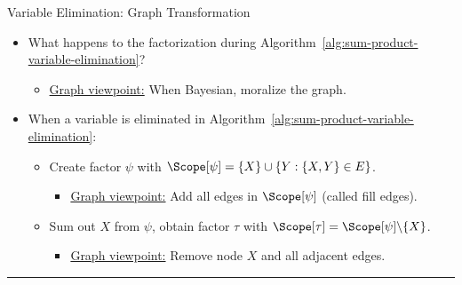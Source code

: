 \begin{frame}{Variable Elimination: Graph Transformation}
\begin{itemize}
    \item What happens to the factorization during Algorithm~\ref{alg:sum-product-variable-elimination}?
    \pause
    \begin{itemize}
        \item \underline{Graph viewpoint:} When Bayesian, moralize the graph.
    \end{itemize}
    \pause
    \item When a variable is eliminated in Algorithm~\ref{alg:sum-product-variable-elimination}:
    \begin{itemize}
    \pause \item Create factor $\psi$ with $\Scope[\psi] = \{X\} \cup \{Y : \{X,Y\} \in E\}$.
        \begin{itemize}
    \pause \item \underline{Graph viewpoint:} Add all edges in $\Scope[\psi]$ (called fill edges).
        \end{itemize}
    \pause \item Sum out $X$ from $\psi$, obtain factor $\tau$ with $\Scope[\tau] = \Scope[\psi] \backslash \{X\}$.
        \begin{itemize}
    \pause \item \underline{Graph viewpoint:} Remove node $X$ and all adjacent edges.
        \end{itemize}
    \end{itemize}
\end{itemize}
\pause
\hrule
\begin{center}
\end{center}
\end{frame}

